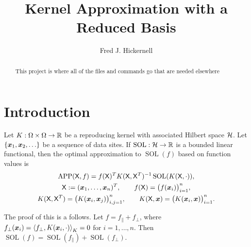 \documentclass{amsart}
\DeclareMathOperator{\SOL}{SOL}
\DeclareMathOperator{\APP}{APP}
\begin{document}
\title{Kernel Approximation with a Reduced Basis}
\author{Fred J. Hickernell}
\begin{abstract}This project is where all of the files and commands go that are needed elsewhere
\end{abstract}

\maketitle

\section{Introduction}\label{sec:intro}
Let $K:\Omega \times \Omega \to \reals$ be a reproducing kernel with associated Hilbert space $\ch$. Let $\{\vx_1, \vx_2, \ldots\}$ be a sequence of data sites.  If $\SOL: \ch \to \reals$ is a bounded linear functional, then the optimal approximation to $\SOL(f)$ based on function values  is
\begin{subequations}  \label{eq:bestappx}
\begin{gather}
    \APP(\mX,f) =  f(\mX)^T K(\mX,\mX^T)^{-1}\SOL(K(\mX,\cdot)), \\
    \mX := (\vx_1, \dots, \vx_n)^T, \qquad  f(\mX) = \bigl(f(\vx_i) \bigr)_{i=1}^n, \\
    K(\mX,\mX^T) = \bigl(K(\vx_i,\vx_j)\bigr)_{i,j=1}^n, \qquad
     K(\mX,\vx) = \bigl(K(\vx_i,\vx)\bigr)_{i=1}^n.
\end{gather}
\end{subequations}

The proof of this is a follows.  Let $f = f_{\parallel} + f_{\perp}$, where $f_{\perp}(\vx_i) =\ip[K]{f_{\perp}}{K(\vx_i,\cdot)} = 0$ for $i = 1, \ldots, n$.  Then $\SOL(f) = \SOL(f_{\parallel}) + \SOL(f_{\perp})$.
\end{document}
